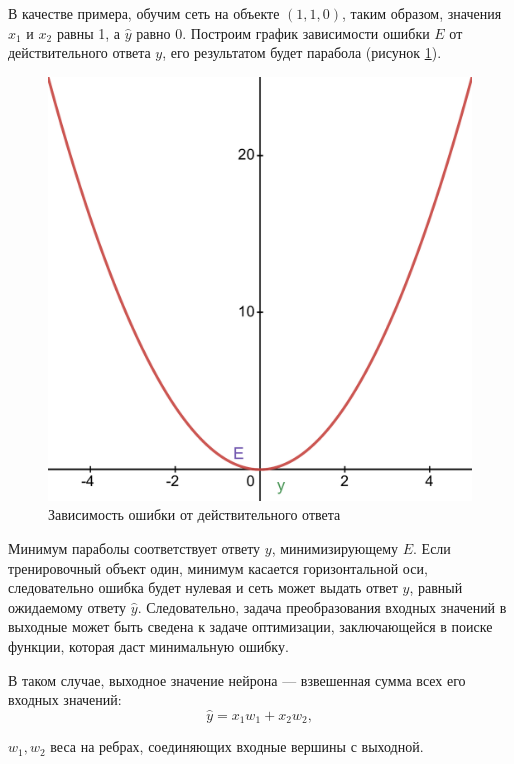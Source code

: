 В качестве примера, обучим сеть на объекте $(1, 1, 0)$, таким образом, значения $x_1$ и $x_2$ равны 1, а $\hat{y}$ равно 0. Построим график зависимости ошибки $E$ от действительного ответа $y$, его результатом будет парабола (рисунок \ref{fig:error}).

\begin{figure}[H]
	\centering
	\includegraphics[width=\textwidth]{img/error.pdf}
	\caption{Зависимость ошибки от действительного ответа}
	\label{fig:error}
\end{figure}

Минимум параболы соответствует ответу $y$, минимизирующему $E$. Если тренировочный объект один, минимум касается горизонтальной оси, следовательно ошибка будет нулевая и сеть может выдать ответ $y$, равный ожидаемому ответу $\hat{y}$. Следовательно, задача преобразования входных значений в выходные может быть сведена к задаче оптимизации, заключающейся в поиске функции, которая даст минимальную ошибку.

В таком случае, выходное значение нейрона --- взвешенная сумма всех его входных значений:
\begin{equation}
	\label{eq:nn5}
	\hat{y} = x_1w_1 + x_2w_2,
\end{equation}
\begin{eqexpl}[15mm]
	\item{$w_1, w_2$} веса на ребрах, соединяющих входные вершины с выходной.
\end{eqexpl}

